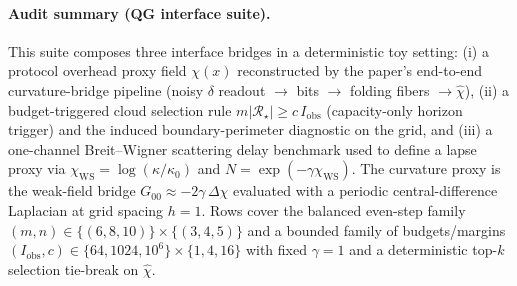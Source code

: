 \paragraph{Audit summary (QG interface suite).} \AuditTag This suite composes three interface bridges in a deterministic toy setting: (i) a protocol overhead proxy field $\chi(x)$ reconstructed by the paper's end-to-end curvature-bridge pipeline (noisy $\delta$ readout $\to$ bits $\to$ folding fibers $\to \hat\chi$), (ii) a budget-triggered cloud selection rule $m|\mathcal R_\star|\ge c\,I_{\mathrm{obs}}$ (capacity-only horizon trigger) and the induced boundary-perimeter diagnostic on the grid, and (iii) a one-channel Breit--Wigner scattering delay benchmark used to define a lapse proxy via $\chi_{\mathrm{WS}}=\log(\kappa/\kappa_0)$ and $N=\exp(-\gamma\chi_{\mathrm{WS}})$. The curvature proxy is the weak-field bridge $G_{00}\approx -2\gamma\,\Delta\chi$ evaluated with a periodic central-difference Laplacian at grid spacing $h=1$. Rows cover the balanced even-step family $(m,n)\in\{(6, 8, 10)\}\times\{(3, 4, 5)\}$ and a bounded family of budgets/margins $(I_{\mathrm{obs}},c)\in\{64,1024,10^6\}\times\{1,4,16\}$ with fixed $\gamma=1$ and a deterministic top-$k$ selection tie-break on $\hat\chi$.